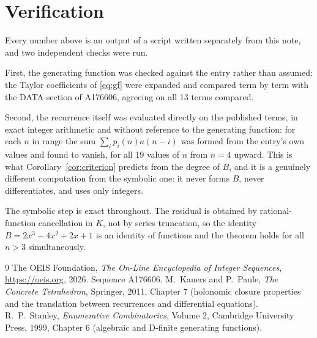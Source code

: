 \documentclass[11pt,a4paper]{article}
\theoremstyle{plain}
\theoremstyle{definition}
\begin{document}
\section{Verification}

Every number above is an output of a script written separately from this note, and two
independent checks were run.

First, the generating function was checked against the entry rather than assumed: the
Taylor coefficients of \eqref{eq:gf} were expanded and compared term by term with the DATA
section of A176606, agreeing on all 13 terms compared.

Second, the recurrence itself was evaluated directly on the published terms, in exact
integer arithmetic and without reference to the generating function: for each $n$ in range
the sum $\sum_{i}p_{i}(n)a(n-i)$ was formed from the entry's own values and found to
vanish, for all 19 values of $n$ from $n=4$ upward. This is what
Corollary~\ref{cor:criterion} predicts from the degree of $B$, and it is a genuinely
different computation from the symbolic one: it never forms $B$, never differentiates, and
uses only integers.

The symbolic step is exact throughout. The residual is obtained by rational-function
cancellation in $K$, not by series truncation, so the identity $B=2 x^{3} - 4 x^{2} + 2 x + 1$ is an
identity of functions and the theorem holds for all $n>3$ simultaneously.

\begin{thebibliography}{9}
 The OEIS Foundation, \emph{The On-Line Encyclopedia of Integer Sequences},
\url{https://oeis.org}, 2026. Sequence A176606.
 M.~Kauers and P.~Paule, \emph{The Concrete Tetrahedron}, Springer, 2011,
Chapter 7 (holonomic closure properties and the translation between recurrences and
differential equations).
 R.~P.~Stanley, \emph{Enumerative Combinatorics}, Volume 2, Cambridge
University Press, 1999, Chapter 6 (algebraic and D-finite generating functions).
\end{thebibliography}
\end{document}
